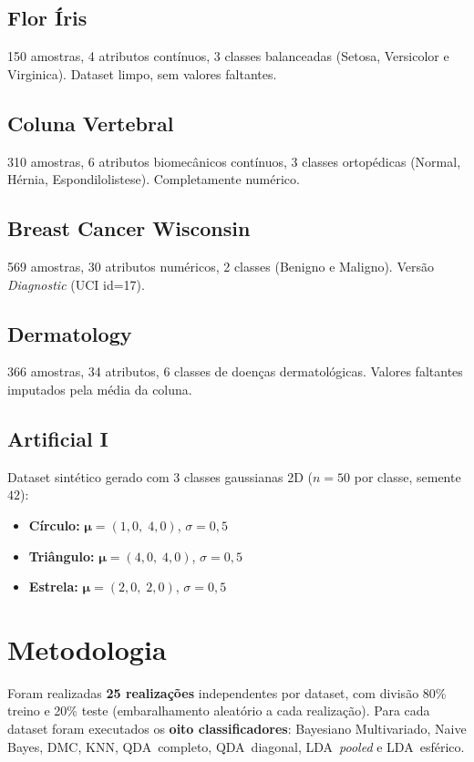 \documentclass[12pt, a4paper]{article}
\begin{document}
\subsection{Flor Íris}
150 amostras, 4 atributos contínuos, 3 classes balanceadas (Setosa,
Versicolor e Virginica). Dataset limpo, sem valores faltantes.

\subsection{Coluna Vertebral}
310 amostras, 6 atributos biomecânicos contínuos, 3 classes
ortopédicas (Normal, Hérnia, Espondilolistese). Completamente
numérico.

\subsection{Breast Cancer Wisconsin}
569 amostras, 30 atributos numéricos, 2 classes (Benigno e Maligno).
Versão \textit{Diagnostic} (UCI id=17).

\subsection{Dermatology}
366 amostras, 34 atributos, 6 classes de doenças dermatológicas.
Valores faltantes imputados pela média da coluna.

\subsection{Artificial I}
Dataset sintético gerado com 3 classes gaussianas 2D
($n=50$ por classe, semente $42$):
\begin{itemize}
    \item \textbf{Círculo:} $\boldsymbol{\mu}=(1{,}0,\;4{,}0)$, $\sigma=0{,}5$
    \item \textbf{Triângulo:} $\boldsymbol{\mu}=(4{,}0,\;4{,}0)$, $\sigma=0{,}5$
    \item \textbf{Estrela:} $\boldsymbol{\mu}=(2{,}0,\;2{,}0)$, $\sigma=0{,}5$
\end{itemize}

\section{Metodologia}

Foram realizadas \textbf{25 realizações} independentes por dataset,
com divisão 80\% treino e 20\% teste (embaralhamento aleatório a cada
realização). Para cada dataset foram executados os \textbf{oito
classificadores}: Bayesiano Multivariado, Naive Bayes, DMC, KNN,
QDA~completo, QDA~diagonal, LDA~\textit{pooled} e LDA~esférico.
\end{document}
